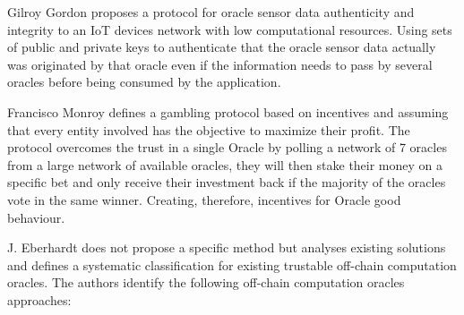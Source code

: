 Gilroy Gordon \citet{Gordon2017} proposes a protocol for oracle sensor data authenticity and integrity to an IoT devices network with low computational resources. Using sets of public and private keys to authenticate that the oracle sensor data actually was originated by that oracle even if the information needs to pass by several oracles before being consumed by the application.

Francisco Monroy \citet{MontotoMonroy2018} defines a gambling protocol based on incentives and assuming that every entity involved has the objective to maximize their profit. The protocol overcomes the trust in a single Oracle by polling a network of 7 oracles from a large network of available oracles, they will then stake their money on a specific bet and only receive their investment back if the majority of the oracles vote in the same winner. Creating, therefore, incentives for Oracle good behaviour.


J. Eberhardt \citet{Eberhardt2018} does not propose a specific method but analyses existing solutions and defines a systematic classification for existing trustable off-chain computation oracles. The authors identify the following off-chain computation oracles approaches:



